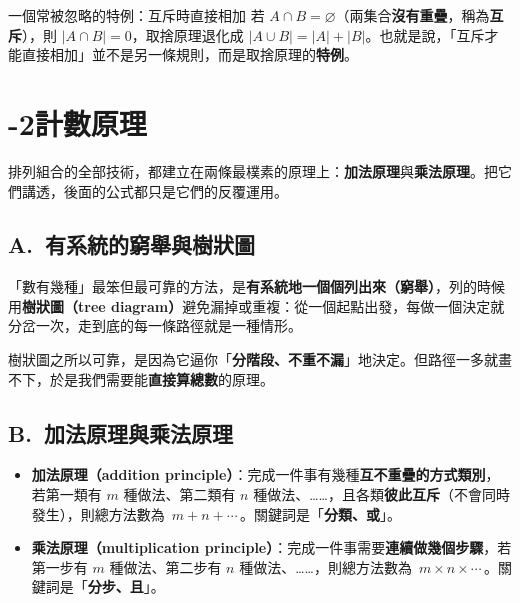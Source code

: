 \documentclass[11pt]{article}
\begin{document}
\begin{補充框}{一個常被忽略的特例：互斥時直接相加}
若 $A\cap B=\varnothing$（兩集合\textbf{沒有重疊}，稱為\textbf{互斥}），則 $|A\cap B|=0$，取捨原理退化成 $|A\cup B|=|A|+|B|$。也就是說，「互斥才能直接相加」並不是另一條規則，而是取捨原理的\textbf{特例}。
\end{補充框}

\section*{-2\quad 計數原理}

排列組合的全部技術，都建立在兩條最樸素的原理上：\textbf{加法原理}與\textbf{乘法原理}。把它們講透，後面的公式都只是它們的反覆運用。

\subsection*{\sffamily A.\ 有系統的窮舉與樹狀圖}

「數有幾種」最笨但最可靠的方法，是\textbf{有系統地一個個列出來（窮舉）}，列的時候用\textbf{樹狀圖（tree diagram）}避免漏掉或重複：從一個起點出發，每做一個決定就分岔一次，走到底的每一條路徑就是一種情形。


樹狀圖之所以可靠，是因為它逼你「\textbf{分階段、不重不漏}」地決定。但路徑一多就畫不下，於是我們需要能\textbf{直接算總數}的原理。

\subsection*{\sffamily B.\ 加法原理與乘法原理}

\begin{itemize}\setlength{\itemsep}{4pt}
\item \textbf{加法原理（addition principle）}：完成一件事有幾種\textbf{互不重疊的方式類別}，若第一類有 $m$ 種做法、第二類有 $n$ 種做法、……，且各類\textbf{彼此互斥}（不會同時發生），則總方法數為 $\boxed{\,m+n+\cdots\,}$。關鍵詞是「\textbf{分類、或}」。
\item \textbf{乘法原理（multiplication principle）}：完成一件事需要\textbf{連續做幾個步驟}，若第一步有 $m$ 種做法、第二步有 $n$ 種做法、……，則總方法數為 $\boxed{\,m\times n\times\cdots\,}$。關鍵詞是「\textbf{分步、且}」。
\end{itemize}
\end{document}

